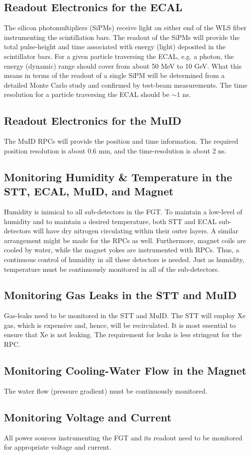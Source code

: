 \subsection{Readout Electronics for the ECAL}

The silicon photomultipliers (SiPMs) receive light on either end of
the WLS fiber 
instrumenting the scintillation bars. The readout of the SiPMs will provide the total 
pulse-height and time associated with energy (light) deposited in the scintillator bars. 
For a given particle traversing the ECAL, e.g. a photon, the energy (dynamic) range 
should cover from about 50 MeV to 10 GeV. What this means in terms of
the readout of a single SiPM will be determined from a detailed Monte Carlo study 
and confirmed by test-beam measurements.
The time resolution for a particle traversing the ECAL should be $\sim 1$ ns.

\subsection{Readout Electronics for the MuID}

The MuID RPCs will provide the position and time information. The required position 
resolution is about 0.6 mm, and the time-resolution is about 2 ns.

\subsection{Monitoring Humidity \& Temperature in the STT, ECAL, MuID, and Magnet}

Humidity is inimical to all sub-detectors in the FGT. To maintain a low-level of 
humidity and to maintain a desired temperature, both STT and ECAL sub-detectors
will have dry nitrogen circulating within their outer layers. A similar arrangement 
might be made for the RPCs as well. Furthermore, magnet coils are cooled by water, 
while the magnet yokes are instrumented with RPCs. Thus, a continuous control of 
humidity in all these detectors is needed.
Just as humidity, temperature must be continuously monitored in all of the sub-detectors.

\subsection{Monitoring Gas Leaks in the STT and MuID}

Gas-leaks need to be monitored in the STT and MuID.
The STT will employ Xe gas, which is expensive and, hence, will be recirculated. It is 
most essential to ensure that Xe is not leaking. The requirement for leaks is less 
stringent for the RPC. 

\subsection{Monitoring Cooling-Water Flow in the Magnet}

The water flow (pressure gradient) must be continuously monitored.

\subsection{Monitoring Voltage and Current}

All power sources instrumenting the FGT and its readout need to be monitored for 
appropriate voltage and current.

